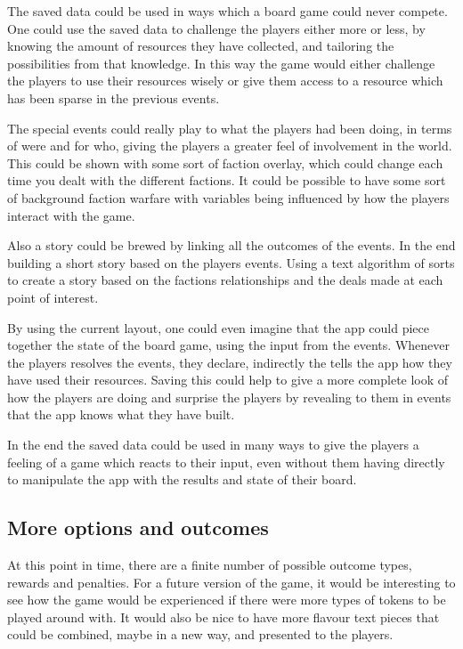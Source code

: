 The saved data could be used in ways which a board game could never compete. One could use the saved data to challenge the players either more or less, by knowing the amount of resources they have collected, and tailoring the possibilities from that knowledge. In this way the game would either challenge the players to use their resources wisely or give them access to a resource which has been sparse in the previous events. 

The special events could really play to what the players had been doing, in terms of were and for who, giving the players a greater feel of involvement in the world. This could be shown with some sort of faction overlay, which could change each time you dealt with the different factions. It could be possible to have some sort of background faction warfare with variables being influenced by how the players interact with the game.

Also a story could be brewed by linking all the outcomes of the events. In the end building a short story based on the players events. Using a text algorithm of sorts to create a story based on the factions relationships and the deals made at each point of interest. 

By using the current layout, one could even imagine that the app could piece together the state of the board game, using the input from the events. Whenever the players resolves the events, they declare, indirectly the tells the app how they have used their resources. Saving this could help to give a more complete look of how the players are doing and surprise the players by revealing to them in events that the app knows what they have built.

In the end the saved data could be used in many ways to give the players a feeling of a game which reacts to their input, even without them having directly to manipulate the app with the results and state of their board.

\subsection{More options and outcomes}
At this point in time, there are a finite number of possible outcome types, rewards and penalties. For a future version of the game, it would be interesting to see how the game would be experienced if there were more types of tokens to be played around with. It would also be nice to have more flavour text pieces that could be combined, maybe in a new way, and presented to the players. 

